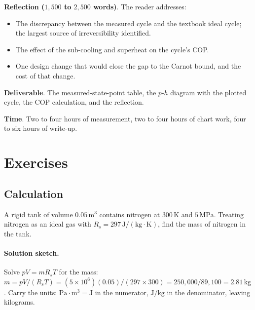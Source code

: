 \begin{project}
\textbf{Reflection ($1{,}500$ to $2{,}500$ words)}. The reader
addresses:

\begin{itemize}[leftmargin=*]
  \item The discrepancy between the measured cycle and the textbook
    ideal cycle; the largest source of irreversibility identified.
  \item The effect of the sub-cooling and superheat on the cycle's
    COP.
  \item One design change that would close the gap to the Carnot
    bound, and the cost of that change.
\end{itemize}

\textbf{Deliverable}. The measured-state-point table, the $p$-$h$
diagram with the plotted cycle, the COP calculation, and the
reflection.

\textbf{Time}. Two to four hours of measurement, two to four hours of
chart work, four to six hours of write-up.
\end{project}

\section{Exercises}

\subsection*{Calculation}

\begin{exercise}
A rigid tank of volume $0.05\,\text{m}^3$ contains nitrogen at $300\,
\si{\kelvin}$ and $5\,\text{MPa}$. Treating nitrogen as an ideal gas
with $R_s = 297\,\text{J}/(\text{kg}\cdot\si{\kelvin})$, find the
mass of nitrogen in the tank.

\paragraph{Solution sketch.} Solve $pV = m R_s T$ for the mass:
$m = pV/(R_s T) = (5\times 10^6)(0.05)/(297\times 300) = 250{,}000/89{,}100
= 2.81\,\text{kg}$. Carry the units: $\text{Pa}\cdot\text{m}^3 = \text{J}$
in the numerator, $\text{J}/\text{kg}$ in the denominator, leaving
kilograms.
\end{exercise}

